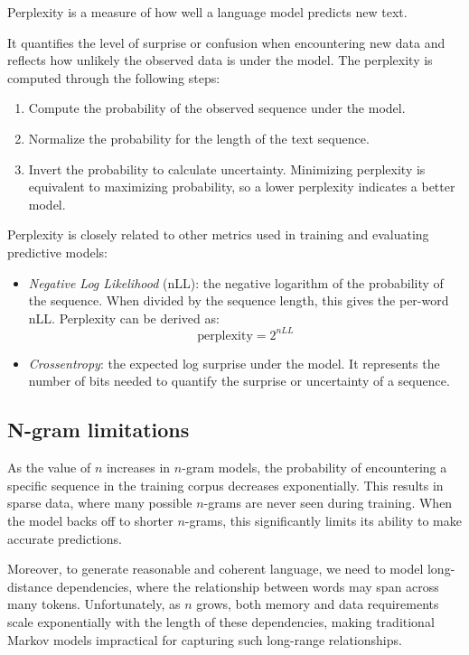 \begin{definition}
    Perplexity is a measure of how well a language model predicts new text.
\end{definition}
\noindent  It quantifies the level of surprise or confusion when encountering new data and reflects how unlikely the observed data is under the model.
The perplexity is computed through the following steps:
\begin{enumerate}
    \item Compute the probability of the observed sequence under the model.
    \item Normalize the probability for the length of the text sequence.
    \item Invert the probability to calculate uncertainty. 
        Minimizing perplexity is equivalent to maximizing probability, so a lower perplexity indicates a better model.
\end{enumerate}
Perplexity is closely related to other metrics used in training and evaluating predictive models:
\begin{itemize}
    \item \textit{Negative Log Likelihood} (nLL): the negative logarithm of the probability of the sequence. 
        When divided by the sequence length, this gives the per-word nLL. 
        Perplexity can be derived as:
        \[\text{perplexity}=2^{nLL}\]
    \item \textit{Crossentropy}: the expected log surprise under the model. 
        It represents the number of bits needed to quantify the surprise or uncertainty of a sequence.
\end{itemize}

\subsection{N-gram limitations}
As the value of $n$ increases in $n$-gram models, the probability of encountering a specific sequence in the training corpus decreases exponentially. 
This results in sparse data, where many possible $n$-grams are never seen during training. 
When the model backs off to shorter $n$-grams, this significantly limits its ability to make accurate predictions.

Moreover, to generate reasonable and coherent language, we need to model long-distance dependencies, where the relationship between words may span across many tokens.
Unfortunately, as $n$ grows, both memory and data requirements scale exponentially with the length of these dependencies, making traditional Markov models impractical for capturing such long-range relationships.